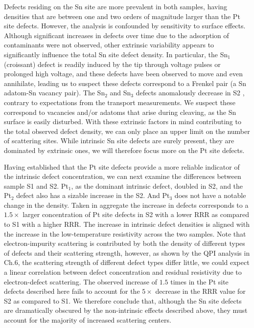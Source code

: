 \par Defects residing on the Sn site are more prevalent in both samples, having densities that are between one and two orders of magnitude larger than the Pt site defects. However, the analysis is confounded by sensitivity to surface effects. Although significant increases in defects over time due to the adsorption of contaminants were not observed, other extrinsic variability appears to significantly influence the total Sn site defect density. In particular, the Sn$_1$ (croissant) defect is readily induced by the tip through voltage pulses or prolonged high voltage, and these defects have been observed to move and even annihilate, leading us to suspect these defects correspond to a Frenkel pair (a Sn adatom-Sn vacancy pair). The Sn$_2$ and Sn$_3$ defects anomalously decrease in S2 , contrary to expectations from the transport measurements. We suspect these correspond to vacancies and/or adatoms that arise during cleaving, as the Sn surface is easily disturbed. With these extrinsic factors in mind contributing to the total observed defect density, we can only place an upper limit on the number of scattering sites. While intrinsic Sn site defects are surely present, they are dominated by extrinsic ones, we will therefore focus more on the Pt site defects.

\par Having established that the Pt site defects provide a more reliable indicator of the intrinsic defect concentration, we can next examine the differences between sample S1 and S2. Pt$_1$, as the dominant intrinsic defect, doubled in S2, and the Pt$_2$ defect also has a sizable increase in the S2. And Pt$_3$ does not have a notable change in the density. Taken in aggregate the increase in defects corresponds to a $1.5\times$ larger concentration of Pt site defects in S2 with a lower \ac{RRR} as compared to S1 with a higher \ac{RRR}.  The increase in intrinsic defect densities is aligned with the increase in the low-temperature resistivity across the two samples. 
Note that electron-impurity scattering is contributed by both the density of different types of defects and their scattering strength, however, as shown by the \ac{QPI} analysis in Ch.6, the scattering strength of different defect types differ little, we could expect a linear correlation between defect concentration and residual resistivity due to electron-defect scattering. The observed increase of $1.5$ times in the Pt site defects described here fails to account for the $5\times$ decrease in the \ac{RRR} value for S2 as compared to S1. We therefore conclude that, although the Sn site defects are dramatically obscured by the non-intrinsic effects described above, they must account for the majority of increased scattering centers. 


